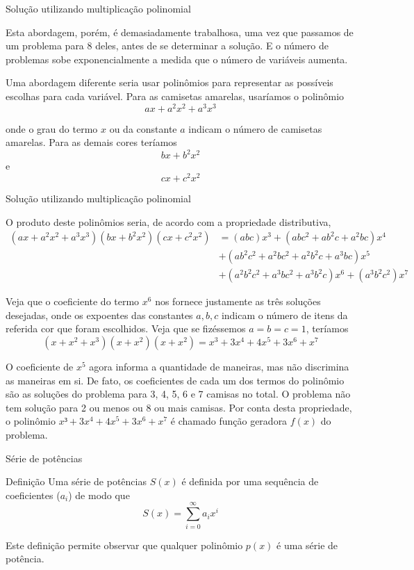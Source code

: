 \begin{frame}[fragile]{Solução utilizando multiplicação polinomial}

Esta abordagem, porém, é demasiadamente trabalhosa, uma vez que passamos de um problema para 8
deles, antes de se determinar a solução. E o número de problemas sobe exponencialmente a 
medida que o número de variáveis aumenta.

Uma abordagem diferente seria usar polinômios para representar as possíveis escolhas para
cada variável. Para as camisetas amarelas, usaríamos o polinômio
\[
        ax + a^2x^2 + a^3x^3
\]

onde o grau do termo $x$ ou da constante $a$ indicam o número de camisetas amarelas. Para as
demais cores teríamos
\[
        bx + b^2x^2
\]
e
\[
        cx + c^2x^2
\]
\end{frame}

\begin{frame}[fragile]{Solução utilizando multiplicação polinomial}

O produto deste polinômios seria, de acordo com a propriedade distributiva,
\[
\begin{split}
        (ax + a^2x^2 + a^3x^3)(bx + b^2x^2)(cx + c^2x^2) & =(abc)x^3 + (abc^2 + ab^2c + a^2bc)x^4 \\
    &+ (ab^2c^2 + a^2bc^2 + a^2b^2c + a^3bc)x^5\\
    &+ (a^2b^2c^2 + a^3bc^2+ a^3b^2c)x^6 + (a^3b^2c^2)x^7
\end{split}
\]

Veja que o coeficiente do termo $x^6$ nos fornece justamente as três soluções desejadas, onde
os expoentes das constantes $a, b, c$ indicam o número de itens da referida cor que foram
escolhidos. Veja que se fizéssemos $a = b = c = 1$, teríamos
\[ 
        (x + x^2 + x^3)(x + x^2)(x + x^2) = x^3 + 3x^4 + 4x^5 + 3x^6 + x^7
\]

O coeficiente de $x^5$ agora informa a quantidade de maneiras, mas não discrimina as maneiras em
si. De fato, os coeficientes de cada um dos termos do polinômio são as soluções do problema para
3, 4, 5, 6 e 7 camisas no total. O problema não tem solução para 2 ou menos ou 8 ou mais camisas.
Por conta desta propriedade, o polinômio $x³ + 3x^4 + 4x^5 + 3x^6 + x^7$ é chamado função 
geradora $f(x)$ do problema.

\end{frame}

\begin{frame}[fragile]{Série de potências}

    \begin{block}{Definição}
        Uma série de potências $S(x)$ é definida por uma sequência de coeficientes ($a_i$) de modo que
        \[
        S(x) = \sum_{i=0}^\infty a_ix^i
        \]

    \end{block}

    \vspace{0.2in}

Este definição permite observar que qualquer polinômio $p(x)$ é uma série de potência.

\end{frame}

